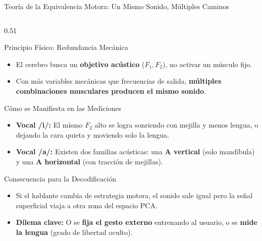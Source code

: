 \begin{frame}{Teoría de la Equivalencia Motora: Un Mismo Sonido, Múltiples Caminos}
    \begin{columns}[c]
        \begin{column}{0.51\textwidth}
            \scriptsize
            \begin{block}{Principio Físico: Redundancia Mecánica}
                \begin{itemize}\setlength{\itemsep}{0pt}\setlength{\parskip}{0pt}
                    \item El cerebro busca un \textbf{objetivo acústico} ($F_1, F_2$), no activar un músculo fijo.
                    \item Con más variables mecánicas que frecuencias de salida, \textbf{múltiples combinaciones musculares producen el mismo sonido}.
                \end{itemize}
            \end{block}
            \vspace{0.03cm}
            \begin{block}{Cómo se Manifiesta en las Mediciones}
                \begin{itemize}\setlength{\itemsep}{0pt}\setlength{\parskip}{0pt}
                    \item \textbf{Vocal /i/:} El mismo $F_2$ alto se logra sonriendo con mejilla y menos lengua, o dejando la cara quieta y moviendo solo la lengua.
                    \item \textbf{Vocal /a/:} Existen dos familias acústicas: una \textbf{A vertical} (solo mandíbula) y una \textbf{A horizontal} (con tracción de mejillas).
                \end{itemize}
            \end{block}
            \vspace{0.03cm}
            \begin{alertblock}{Consecuencia para la Decodificación}
                \begin{itemize}\setlength{\itemsep}{0pt}\setlength{\parskip}{0pt}
                    \item Si el hablante cambia de estrategia motora, el sonido sale igual pero la señal superficial viaja a otra zona del espacio PCA.
                    \item \textbf{Dilema clave:} O se \textbf{fija el gesto externo} entrenando al usuario, o se \textbf{mide la lengua} (grado de libertad oculto).

\end{itemize}
\end{alertblock}
\end{column}
\end{columns}
\end{frame}

